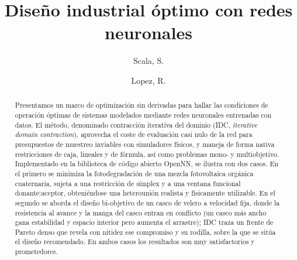 \documentclass[5p,times,authoryear]{sciarticle}
\begin{document}
\begin{frontmatter}


\title{Diseño industrial óptimo con redes neuronales}

\author[A,B]{Scala, S.}
\author[A]{Lopez, R.}


\address[A]{Artelnics, C/ del Adaja 10, 37185 Villamayor, Salamanca, España.}
\address[B]{KU Leuven, Departamento de Ingeniería Química, Celestijnenlaan 200F, 3001 Lovaina, Bélgica.}

\begin{comocitar}
\begin{center}
\begin{tcolorbox}[frame hidden, width=\linewidth*2, colframe=white, colback=black!8!white]
\end{tcolorbox}
\end{center}
\end{comocitar}

\begin{abstract}
Presentamos un marco de optimización sin derivadas para hallar las
condiciones de operación óptimas de sistemas modelados mediante redes
neuronales entrenadas con datos. El método, denominado contracción
iterativa del dominio (IDC, \emph{iterative domain contraction}),
aprovecha el coste de evaluación casi nulo de la red para presupuestos de
muestreo inviables con simuladores físicos, y maneja de forma nativa
restricciones de caja, lineales y de fórmula, así como problemas
mono- y multiobjetivo. Implementado en la biblioteca de código abierto
OpenNN, se ilustra con dos casos. En el primero se minimiza la
fotodegradación de una mezcla fotovoltaica orgánica cuaternaria, sujeta a
una restricción de símplex y a una ventana funcional donante:aceptor,
obteniéndose una heterounión realista y físicamente utilizable. En el
segundo se aborda el diseño bi-objetivo de un casco de velero a velocidad
fija, donde la resistencia al avance y la manga del casco entran en
conflicto (un casco más ancho gana estabilidad y espacio interior pero
aumenta el arrastre); IDC traza un frente de Pareto denso que revela con
nitidez ese compromiso y su rodilla, sobre la que se sitúa el diseño
recomendado. En ambos casos los resultados son muy satisfactorios y
prometedores.
\end{abstract}


\end{frontmatter}
\end{document}
